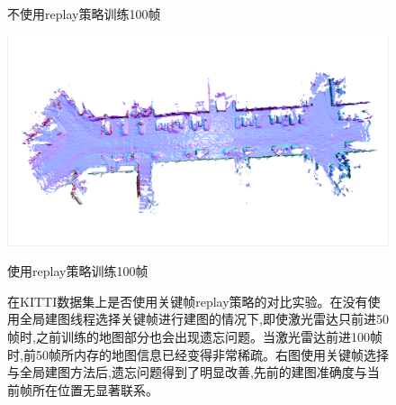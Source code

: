 \begin{figure}[p]
\begin{minipage}{0.5\linewidth}
        \caption*{不使用replay策略训练100帧}
	\end{minipage}\hfill
	\begin{minipage}{0.5\linewidth}
		\centering
		\includegraphics[width=1\linewidth]{figures/100o.png}
        \caption*{使用replay策略训练100帧}
	\end{minipage}
    \caption{在KITTI数据集上是否使用关键帧replay策略的对比实验。在没有使用全局建图线程选择关键帧进行建图的情况下,即使激光雷达只前进50帧时,之前训练的地图部分也会出现遗忘问题。当激光雷达前进100帧时,前50帧所内存的地图信息已经变得非常稀疏。右图使用关键帧选择与全局建图方法后,遗忘问题得到了明显改善,先前的建图准确度与当前帧所在位置无显著联系。}\label{replay}
\end{figure}

